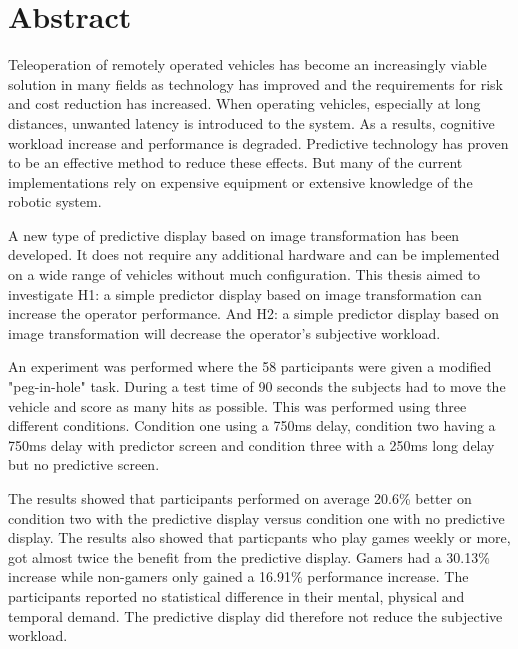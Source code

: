 \chapter*{Abstract}

Teleoperation of remotely operated vehicles has become an increasingly viable solution in many fields as technology has improved and the requirements for risk and cost reduction has increased. When operating vehicles, especially at long distances, unwanted latency is introduced to the system. As a results, cognitive workload increase and performance is degraded. Predictive technology has proven to be an effective method to reduce these effects. But many of the current implementations rely on expensive equipment or extensive knowledge of the robotic system.

A new type of predictive display based on image transformation has been developed. It does not require any additional hardware and can be implemented on a wide range of vehicles without much configuration. This thesis aimed to investigate H1: a simple predictor display based on image transformation can increase the operator performance. And H2: a simple predictor display based on image transformation will decrease the operator's subjective workload.

An experiment was performed where the 58 participants were given a modified "peg-in-hole" task. During a test time of 90 seconds the subjects had to move the vehicle and score as many hits as possible. This was performed using three different conditions. Condition one using a 750ms delay, condition two having a 750ms delay with predictor screen and condition three with a 250ms long delay but no predictive screen.

The results showed that participants performed on average 20.6\% better on condition two with the predictive display versus condition one with no predictive display. The results also showed that particpants who play games weekly or more, got almost twice the benefit from the predictive display. Gamers had a 30.13\% increase while non-gamers only gained a 16.91\% performance increase. The participants reported no statistical difference in their mental, physical and temporal demand. The predictive display did therefore not reduce the subjective workload.
